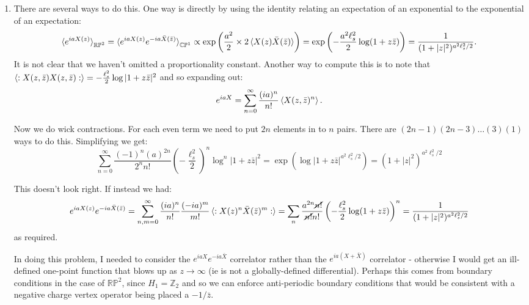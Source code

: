 \documentclass[11pt]{article}
\begin{document}
\begin{enumerate}
\[\begin{aligned}
		\braket{\psi_{DD}(z) \psi_{DD} (w)} &= \frac{z+w}{2 \sqrt{z w} (z - w)}, \quad 
		\braket{\psi_{DD}(z) \bar \psi_{DD} (\bar w)} = -\frac{z+\bar w}{2 \sqrt{z \bar w} (z - \bar w)} \\
		\braket{\psi_{DN}(z) \psi_{DN} (w)} &= \frac{1}{z-w}, \;\, \qquad \qquad 
		\braket{\psi_{DN}(z) \bar \psi_{DN} (\bar w)} = \frac{1}{z-\bar w}\\
	\end{aligned}
	\]
	\item There are several ways to do this. One way is directly by using the identity relating an expectation of an exponential to the exponential of an expectation:
	\[
		\braket{e^{i a X(z)}}_{\mathbb{RP}^2} = \braket{e^{i a X(z) } e^{-i a \bar X(\bar z)}}_{\mathbb{CP}^1} \propto \exp\left(\frac{a^2}{2} \times 2 \braket{X(z) \bar X(\bar z)}\right) = \exp\left(-\frac{a^2 \ell_s^2}{2} \log(1 + z \bar z)\right) = \frac{1}{(1+|z|^2)^{a^2 \ell_s^2/2}}.
	\]
	It is not clear that we haven't omitted a proportionality constant. Another way to compute this is to note that $\braket{:X(z, \bar z) X(z, \bar z):} = - \frac{\ell_s^2}{2} \log|1 + z \bar z|^2$ and so expanding out:
	\[
		e^{i a X} = \sum_{n=0}^\infty \frac{(ia)^n}{n!} \braket{X(z, \bar z)^n}.
	\]
	
	Now we do wick contractions. For each even term we need to put $2n$ elements in to $n$ pairs. There are $(2n-1)(2n-3) \dots (3) (1)$ ways to do this. Simplifying we get:
	\[
		\sum_{n=0}^\infty \frac{(-1)^n (a)^{2n}}{2^n n!} \left(-\frac{\ell_s^2}{2}\right)^{n} \log^n |1+z \bar z|^2 = \exp\left(\log|1+z \bar z|^{a^2 \ell_s^2/2} \right) = (1 + |z|^2)^{a^2 \ell_s^2/2}
	\]
	
	This doesn't look right. If instead we had:
	\[
		e^{i a X(z)} e^{-i a \bar X(\bar z)} = \sum_{n,m=0}^\infty \frac{(i a)^n}{n!}  \frac{(-i a)^m}{m!} \braket{:X(z)^n \bar X(\bar z)^m:} = \sum_n \frac{a^{2n} \cancel{n!}}{\cancel{n!} n!} \left(-\frac{\ell_s^2}{2} \log(1 + z \bar z) \right)^n = \frac{1}{(1 + |z|^2)^{a^2 \ell_s^2/2}}
	\]
	as required. 
	
	In doing this problem, I needed to consider the $e^{i a X} e^{-i a \bar X}$ correlator rather than the $e^{i a (X + \bar X)}$ correlator - otherwise I would get an ill-defined one-point function that blows up as $z \to \infty$ (ie is not a globally-defined differential). Perhaps this comes from boundary conditions in the case of $\mathbb{RP}^2$, since $H_1 = \mathbb{Z}_2$ and so we can enforce anti-periodic boundary conditions that would be consistent with a negative charge vertex operator being placed a $-1/\bar z$. 
	

\end{enumerate}
\end{document}
